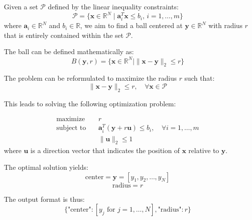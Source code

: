 \documentclass{article}
\begin{document}
Given a set \(\mathcal{P}\) defined by the linear inequality constraints:
\[
\mathcal{P} = \{ \mathbf{x} \in \mathbb{R}^N \mid \mathbf{a}_i^T \mathbf{x} \leq b_i, \, i = 1, \ldots, m \}
\]
where \(\mathbf{a}_i \in \mathbb{R}^N\) and \(b_i \in \mathbb{R}\), we aim to find a ball centered at \(\mathbf{y} \in \mathbb{R}^N\) with radius \(r\) that is entirely contained within the set \(\mathcal{P}\). 

The ball can be defined mathematically as:
\[
B(\mathbf{y}, r) = \{ \mathbf{x} \in \mathbb{R}^N \mid \|\mathbf{x} - \mathbf{y}\|_2 \leq r \}
\]

The problem can be reformulated to maximize the radius \(r\) such that:
\[
\|\mathbf{x} - \mathbf{y}\|_2 \leq r, \quad \forall \mathbf{x} \in \mathcal{P}
\]

This leads to solving the following optimization problem:

\[
\begin{aligned}
\text{maximize} & \quad r \\
\text{subject to} & \quad \mathbf{a}_i^T (\mathbf{y} + r \mathbf{u}) \leq b_i, \quad \forall i = 1, \ldots, m \\
& \quad \|\mathbf{u}\|_2 \leq 1
\end{aligned}
\]
where \(\mathbf{u}\) is a direction vector that indicates the position of \(\mathbf{x}\) relative to \(\mathbf{y}\).

The optimal solution yields:
\[
\text{center} = \mathbf{y} = [y_1, y_2, \ldots, y_N]
\]
\[
\text{radius} = r
\]

The output format is thus:
\[
\{
    \text{"center"}: [y_j \text{ for } j = 1, \ldots, N],
    \text{"radius"}: r
\}
\]
\end{document}
